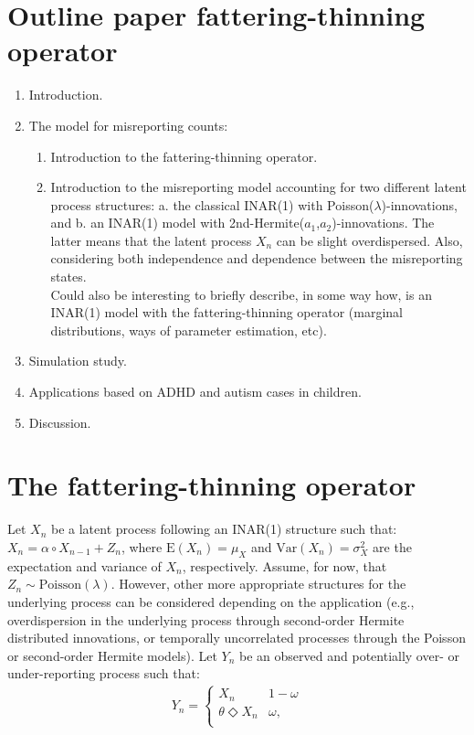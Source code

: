 \documentclass[11pt,a4paper]{article}
\title{}
\author{Amanda Fern\'andez Fontelo}
\begin{document}
\maketitle

\section{Outline paper fattering-thinning operator}

\begin{enumerate}
\item Introduction.
\item The model for misreporting counts:
\begin{enumerate}
\item Introduction to the fattering-thinning operator.
\item Introduction to the misreporting model accounting for two different latent process structures: a. the classical INAR(1) with Poisson($\lambda$)-innovations, and b. an INAR(1) model with 2nd-Hermite($a_1$,$a_2$)-innovations. The latter means that the latent process $X_n$ can be slight overdispersed. Also, considering both independence and dependence between the misreporting states. \\ Could also be interesting to briefly describe, in some way how, is an INAR(1) model with the fattering-thinning operator (marginal distributions, ways of parameter estimation, etc). 
\end{enumerate}
\item Simulation study.
\item Applications based on ADHD and autism cases in children. 
\item Discussion. 
\end{enumerate}

\section{The fattering-thinning operator}

\noindent Let $X_n$ be a latent process following an INAR(1) structure such that: $X_n=\alpha\circ X_{n-1}+Z_n$, where $\textrm{E}(X_n)=\mu_X$ and $\textrm{Var}(X_n)=\sigma_X^2$ are the expectation and variance of $X_n$, respectively. Assume, for now, that $Z_n \sim \textrm{Poisson}(\lambda)$. However, other more appropriate structures for the underlying process can be considered depending on the application (e.g., overdispersion in the underlying process through second-order Hermite distributed innovations, or temporally uncorrelated processes through the Poisson or second-order Hermite models). Let $Y_n$ be an observed and potentially over- or under-reporting process such that: 
\begin{align}\label{eq0:modelfatthin}
 Y_n=\begin{cases} 
X_n &  1-\omega \\
\theta \Diamond X_n & \omega, \\
   \end{cases}
\end{align}
\end{document}
